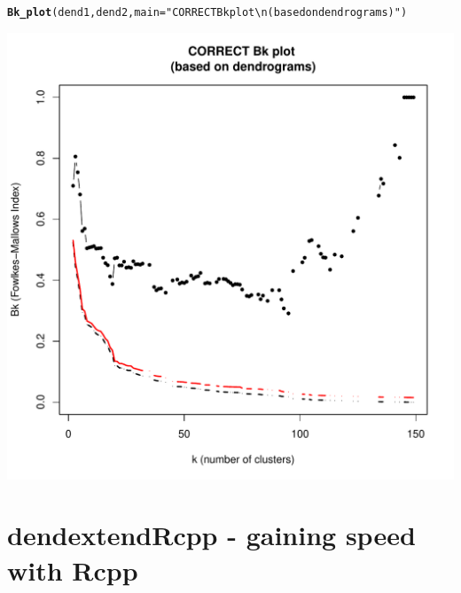 \documentclass[shortnames,nojss,article]{jss}\usepackage[]{graphicx}\usepackage[]{color}
\makeatletter
\def\maxwidth{ %
  \ifdim\Gin@nat@width>\linewidth
    \linewidth
  \else
    \Gin@nat@width
  \fi
}
\newcommand{\hlstr}[1]{\textcolor[rgb]{0.192,0.494,0.8}{#1}}%
\newcommand{\hlstd}[1]{\textcolor[rgb]{0.345,0.345,0.345}{#1}}%
\newcommand{\hlkwc}[1]{\textcolor[rgb]{0.333,0.667,0.333}{#1}}%
\newcommand{\hlkwd}[1]{\textcolor[rgb]{0.737,0.353,0.396}{\textbf{#1}}}%
\newenvironment{kframe}{%
 \def\at@end@of@kframe{}%
 \ifinner\ifhmode%
  \def\at@end@of@kframe{\end{minipage}}%
  \begin{minipage}{\columnwidth}%
 \fi\fi%
 \def\FrameCommand##1{\hskip\@totalleftmargin \hskip-\fboxsep
 \colorbox{shadecolor}{##1}\hskip-\fboxsep
     \hskip-\linewidth \hskip-\@totalleftmargin \hskip\columnwidth}%
 \MakeFramed {\advance\hsize-\width
   \@totalleftmargin\z@ \linewidth\hsize
   \@setminipage}}%
 {\par\unskip\endMakeFramed%
 \at@end@of@kframe}
\newenvironment{knitrout}{}{} %
\makeatother
\begin{document}
\begin{knitrout}
\color{fgcolor}\begin{kframe}
\begin{alltt}
\hlkwd{Bk_plot}\hlstd{(dend1, dend2,} \hlkwc{main} \hlstd{=} \hlstr{"CORRECT Bk plot \textbackslash{}n(based on dendrograms)"}\hlstd{)}
\end{alltt}
\end{kframe}

{\centering \includegraphics[width=\maxwidth]{figure/Bk_plot_for_dends_correct} 

}



\end{knitrout}




% 
% 
% 
% 







\section{dendextendRcpp - gaining speed with Rcpp}
\end{document}
